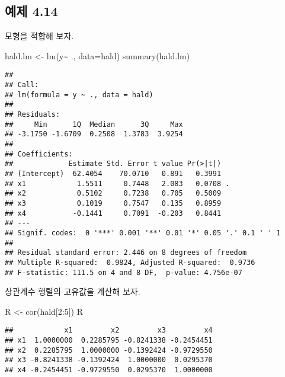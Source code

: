 \documentclass[
]{book}
\newenvironment{Shaded}{\begin{snugshade}}{\end{snugshade}}
\newcommand{\AttributeTok}[1]{\textcolor[rgb]{0.77,0.63,0.00}{#1}}
\newcommand{\DecValTok}[1]{\textcolor[rgb]{0.00,0.00,0.81}{#1}}
\newcommand{\FunctionTok}[1]{\textcolor[rgb]{0.00,0.00,0.00}{#1}}
\newcommand{\NormalTok}[1]{#1}
\newcommand{\OtherTok}[1]{\textcolor[rgb]{0.56,0.35,0.01}{#1}}
\newcommand{\SpecialCharTok}[1]{\textcolor[rgb]{0.00,0.00,0.00}{#1}}
\begin{document}
\hypertarget{uxc608uxc81c-4.14}{%
\subsection{예제 4.14}\label{uxc608uxc81c-4.14}}

모형을 적합해 보자.

\begin{Shaded}
\begin{Highlighting}[]
\NormalTok{hald.lm }\OtherTok{\textless{}{-}} \FunctionTok{lm}\NormalTok{(y}\SpecialCharTok{\textasciitilde{}}\NormalTok{ ., }\AttributeTok{data=}\NormalTok{hald)}
\FunctionTok{summary}\NormalTok{(hald.lm)}
\end{Highlighting}
\end{Shaded}

\begin{verbatim}
## 
## Call:
## lm(formula = y ~ ., data = hald)
## 
## Residuals:
##     Min      1Q  Median      3Q     Max 
## -3.1750 -1.6709  0.2508  1.3783  3.9254 
## 
## Coefficients:
##             Estimate Std. Error t value Pr(>|t|)  
## (Intercept)  62.4054    70.0710   0.891   0.3991  
## x1            1.5511     0.7448   2.083   0.0708 .
## x2            0.5102     0.7238   0.705   0.5009  
## x3            0.1019     0.7547   0.135   0.8959  
## x4           -0.1441     0.7091  -0.203   0.8441  
## ---
## Signif. codes:  0 '***' 0.001 '**' 0.01 '*' 0.05 '.' 0.1 ' ' 1
## 
## Residual standard error: 2.446 on 8 degrees of freedom
## Multiple R-squared:  0.9824, Adjusted R-squared:  0.9736 
## F-statistic: 111.5 on 4 and 8 DF,  p-value: 4.756e-07
\end{verbatim}

상관계수 행렬의 고유값을 계산해 보자.

\begin{Shaded}
\begin{Highlighting}[]
\NormalTok{R }\OtherTok{\textless{}{-}} \FunctionTok{cor}\NormalTok{(hald[}\DecValTok{2}\SpecialCharTok{:}\DecValTok{5}\NormalTok{])}
\NormalTok{R}
\end{Highlighting}
\end{Shaded}

\begin{verbatim}
##            x1         x2         x3         x4
## x1  1.0000000  0.2285795 -0.8241338 -0.2454451
## x2  0.2285795  1.0000000 -0.1392424 -0.9729550
## x3 -0.8241338 -0.1392424  1.0000000  0.0295370
## x4 -0.2454451 -0.9729550  0.0295370  1.0000000
\end{verbatim}
\end{document}
